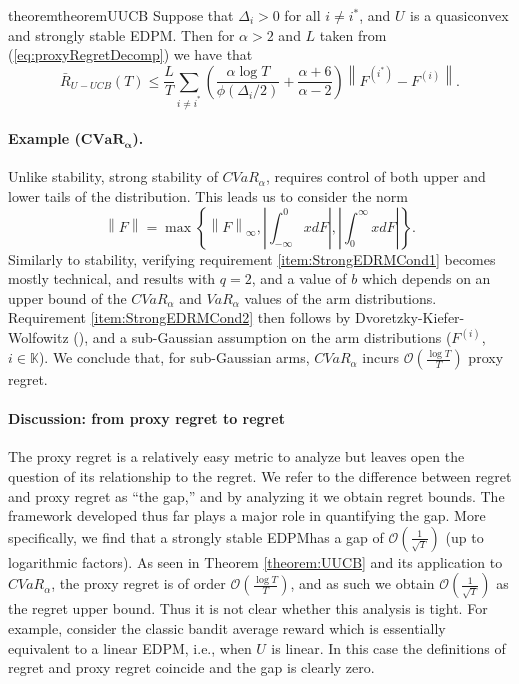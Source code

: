 \documentclass[final,12pt]{colt2018}
\newcommand{\prn}[1]{\left( #1 \right)}
\newcommand{\brc}[1]{\left\lbrace #1 \right\rbrace}
\newcommand{\abs}[1]{\left| #1 \right|}
\newcommand{\norm}[1]{\left\lVert #1 \right\rVert}
\newcommand{\CVAR}[1][\alpha]{CVaR_{#1}}
\newcommand{\VAR}[1][\alpha]{VaR_{#1}}
\newcommand{\EDRMabbrv}{EDPM}
\newcommand{\UUCB}{\RHat-UCB}
\newcommand{\policy}[1][]{\pi^{#1}}
\newcommand{\RHat}[1][]{{U}^{#1}}
\newcommand{\Fi}[1][i]{F^{\prn{{#1}}}}
\newcommand{\FiOpt}{F^{(i^*)}}
\newcommand{\actionSet}{\mathds{K}}
\newcommand{\pseudoRegret}[1][\policy]{\bar{R}_{#1}\prn{T}}
\newcommand{\polyContModCoeff}{b}
\newcommand{\polyContModDeg}{q}
\newcommand{\lipConst}{L}
\newcommand{\phiFunc}{\phi}
\newcommand{\phiFuncAt}[1]{\phiFunc\prn{#1}}
\newcommand{\Di}{\Delta_i}
\begin{document}
	\begin{restatable}[$\mathbf{\UUCB}$ Proxy Regret]{theorem}{theoremUUCB} \label{theorem:UUCB}
		Suppose that $\Di > 0$ for all $i \neq i^*$, and $\RHat$ is a quasiconvex and strongly stable \EDRMabbrv. Then for $\alpha > 2$ and $\lipConst$ taken from (\ref{eq:proxyRegretDecomp}) we have that
		\begin{equation*}
		\pseudoRegret[{\UUCB}]
		\le \frac{\lipConst}{T} \sum_{i \neq i^*} \prn{\frac{\alpha \log T}{\phiFuncAt{\Di / 2}} + \frac{\alpha + 6}{\alpha - 2}} \norm{\FiOpt - \Fi}.
		\end{equation*}
	\end{restatable}
	
	
	
	
	
	\paragraph{Example ($\mathbf{\CVAR}$).} Unlike stability, strong stability of $\CVAR$, requires control of both upper and lower tails of the distribution. This leads us to consider the norm 
	\begin{equation*}
		\norm{F} = \max\brc{\norm{F}_{\infty}, \abs{\int_{-\infty}^{0}x dF}, \abs{\int_{0}^{\infty} x dF}}.
	\end{equation*}
	Similarly to stability, verifying requirement \ref{item:StrongEDRMCond1} becomes mostly technical, and results with $\polyContModDeg = 2$, and a value of $\polyContModCoeff$ which depends on an upper bound of the $\CVAR$ and $\VAR$ values of the arm distributions. Requirement \ref{item:StrongEDRMCond2} then follows by Dvoretzky-Kiefer-Wolfowitz (\cite{massart1990tight}), and a sub-Gaussian assumption on the arm distributions ($\Fi$, $i \in \actionSet$). We conclude that, for sub-Gaussian arms, $\CVAR$ incurs $\mathcal{O}(\frac{\log T}{T})$ proxy regret.
	
	\paragraph{Discussion: from proxy regret to regret}
	The proxy regret is a relatively easy metric to analyze but leaves open the question of its relationship to the regret. We refer to the difference between regret and proxy regret as ``the gap,'' and by analyzing it we obtain regret bounds. The framework developed thus far plays a major role in quantifying the gap. More specifically, we find that a strongly stable \EDRMabbrv\space has a gap of $\mathcal{O}(\frac{1}{\sqrt{T}})$ (up to logarithmic factors). As seen in Theorem \ref{theorem:UUCB} and its application to $\CVAR$, the proxy regret is of order  $\mathcal{O}(\frac{\log T}{T})$, and as such we obtain $\mathcal{O}(\frac{1}{\sqrt{T}})$ as the regret upper bound. Thus it is not clear whether this analysis is tight. For example, consider the classic bandit average reward which is essentially equivalent to a linear \EDRMabbrv, i.e., when $\RHat$ is linear. In this case the definitions of regret and proxy regret coincide and the gap is clearly zero.
	
\end{document}
